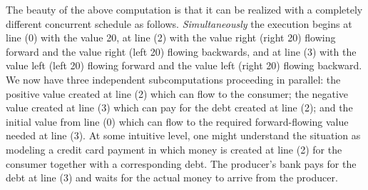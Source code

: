 \documentclass[preprint]{sigplanconf}
\newcommand{\xcomment}[2]{\textbf{#1:~\textsl{#2}}}
\newcommand{\amr}[1]{\xcomment{Amr}{#1}}
\begin{document}

The beauty of the above computation is that it can be realized with a
completely different concurrent schedule as follows. \emph{Simultaneously}
the execution begins at line (0) with the value {{20}}, at line (2) with the
value {{right (right 20)}} flowing forward and the value {{right (left 20)}}
flowing backwards, and at line (3) with the value {{left (left 20)}} flowing
forward and the value {{left (right 20)}} flowing backward. We now have three
independent subcomputations proceeding in parallel: the positive value
created at line (2) which can flow to the consumer; the negative value
created at line (3) which can pay for the debt created at line (2); and the
initial value from line (0) which can flow to the required forward-flowing
value needed at line (3). At some intuitive level, one might understand the
situation as modeling a credit card payment in which money is created at line
(2) for the consumer together with a corresponding debt. The producer's bank
pays for the debt at line (3) and waits for the actual money to arrive from
the producer.
\end{document}
